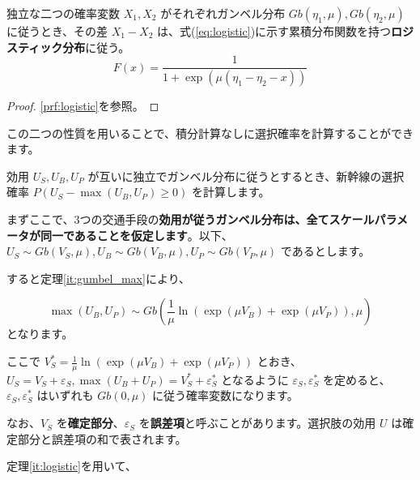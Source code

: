 \begin{theorem}
    \label{it:logistic}
    独立な二つの確率変数 $X_1,X_2$ がそれぞれガンベル分布 $Gb(\eta_1, \mu), Gb(\eta_2, \mu)$ に従うとき、その差 $X_1-X_2$ は、式(\ref{eq:logistic})に示す累積分布関数を持つ\textbf{ロジスティック分布}に従う。
    \begin{equation}
        \label{eq:logistic}
        F(x)=\frac{1}{1+\exp(\mu(\eta_1-\eta_2-x))}
    \end{equation}
\end{theorem}
\begin{proof}
    \ref{prf:logistic}を参照。
\end{proof}

この二つの性質を用いることで、積分計算なしに選択確率を計算することができます。

効用 $U_S,U_B,U_P$ が互いに独立でガンベル分布に従うとするとき、新幹線の選択確率 $P(U_S - \max(U_B,U_P) \geq 0)$ を計算します。

まずここで、3つの交通手段の\textbf{効用が従うガンベル分布は、全てスケールパラメータが同一であることを仮定します}。以下、$U_S \sim Gb(V_S, \mu), U_B \sim Gb(V_B, \mu), U_P \sim Gb(V_P, \mu)$ であるとします。

すると定理\ref{it:gumbel_max}により、

\begin{equation}
    \max(U_B,U_P) \sim Gb\left(\frac{1}{\mu} \ln\left(\exp(\mu V_B)+\exp(\mu V_P)\right), \mu\right)
\end{equation}
となります。

ここで $V_S^*=\frac{1}{\mu} \ln\left(\exp(\mu V_B)+\exp(\mu V_P)\right)$ とおき、$U_S=V_S+\varepsilon_S, \max(U_B+U_P)=V_S^*+\varepsilon_S^*$ となるように $\varepsilon_S, \varepsilon_S^*$ を定めると、$\varepsilon_S, \varepsilon_S^*$ はいずれも $Gb(0,\mu)$ に従う確率変数になります。

なお、$V_S$ を\textbf{確定部分}、$\varepsilon_S$ を\textbf{誤差項}と呼ぶことがあります。選択肢の効用 $U$ は確定部分と誤差項の和で表されます。

定理\ref{it:logistic}を用いて、


